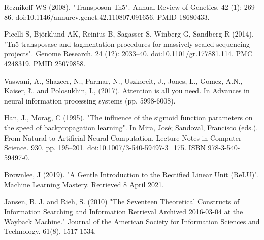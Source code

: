 \begin{thebibliography}{25}
 Reznikoff WS (2008). "Transposon Tn5". Annual Review of Genetics. 42 (1): 269–86. doi:10.1146/annurev.genet.42.110807.091656. PMID 18680433.

 Picelli S, Björklund AK, Reinius B, Sagasser S, Winberg G, Sandberg R (2014). "Tn5 transposase and tagmentation procedures for massively scaled sequencing projects". Genome Research. 24 (12): 2033–40. doi:10.1101/gr.177881.114. PMC 4248319. PMID 25079858.

 Vaswani, A., Shazeer, N., Parmar, N., Uszkoreit, J., Jones, L., Gomez, A.N., Kaiser, Ł. and Polosukhin, I., (2017). Attention is all you need. In Advances in neural information processing systems (pp. 5998-6008).

 Han, J., Morag, C (1995). "The influence of the sigmoid function parameters on the speed of backpropagation learning". In Mira, José; Sandoval, Francisco (eds.). From Natural to Artificial Neural Computation. Lecture Notes in Computer Science. 930. pp. 195–201. doi:10.1007/3-540-59497-3\_175. ISBN 978-3-540-59497-0.

 Brownlee, J (2019). "A Gentle Introduction to the Rectified Linear Unit (ReLU)". Machine Learning Mastery. Retrieved 8 April 2021.

 Jansen, B. J. and Rieh, S. (2010) "The Seventeen Theoretical Constructs of Information Searching and Information Retrieval Archived 2016-03-04 at the Wayback Machine." Journal of the American Society for Information Sciences and Technology. 61(8), 1517-1534.

\end{thebibliography}
